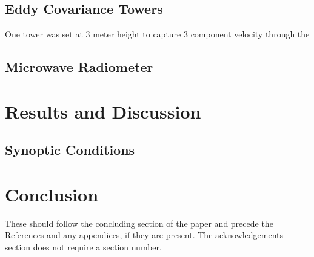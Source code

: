 \documentclass[smallextended]{svjour3}
\begin{document}
\subsection{Eddy Covariance Towers}

One tower was set at 3 meter height to capture 3 component velocity through the 

\subsection{Microwave Radiometer}


\section{Results and Discussion}
\label{sec:res_disc}


\subsection{Synoptic Conditions}



\section{Conclusion}
\label{sec:conclusion}



\begin{acknowledgements}
These should follow the concluding section of the paper and precede the References and any appendices, if they are present. The acknowledgements section does not require a section number. 
\end{acknowledgements} 



\end{document}
